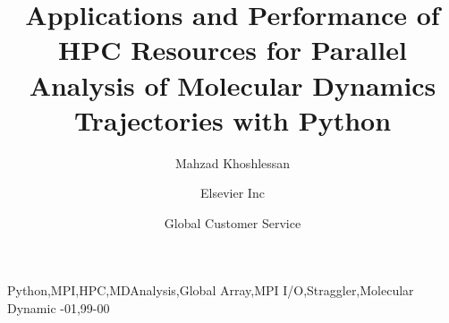 \documentclass[review]{elsarticle}
\begin{document}
\begin{frontmatter}    

\title{Applications and Performance of HPC Resources for Parallel Analysis of Molecular Dynamics Trajectories with Python}

\author{Mahzad Khoshlessan}
\address{Tempe, Arizona, 85281}

\author[mymainaddress,mysecondaryaddress]{Elsevier Inc}

\author[mysecondaryaddress]{Global Customer Service}

\address[mymainaddress]{1600 John F Kennedy Boulevard, Philadelphia}
\address[mysecondaryaddress]{360 Park Avenue South, New York}






    


\begin{keyword}
Python\sep MPI\sep HPC\sep MDAnalysis\sep Global Array\sep MPI I/O\sep Straggler\sep Molecular Dynamic
-01\sep  99-00
\end{keyword}

\end{frontmatter}
\end{document}
